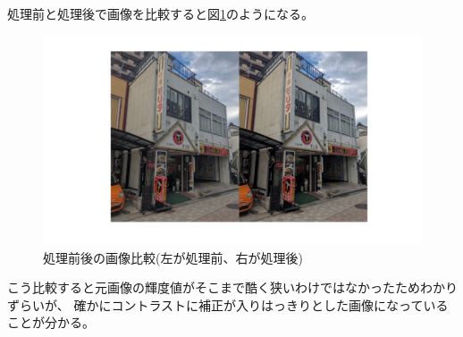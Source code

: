 \documentclass[a4paper,11pt,dvipdfmx]{jsarticle}
\begin{document}
処理前と処理後で画像を比較すると図\ref{conimg}のようになる。
\begin{figure}[htbp]
    \centering
    \includegraphics[width=120mm]{./img/linear_imgcon.jpg}
    \caption{処理前後の画像比較(左が処理前、右が処理後)}
    \label{conimg}
\end{figure}

こう比較すると元画像の輝度値がそこまで酷く狭いわけではなかったためわかりずらいが、
確かにコントラストに補正が入りはっきりとした画像になっていることが分かる。
\end{document}
